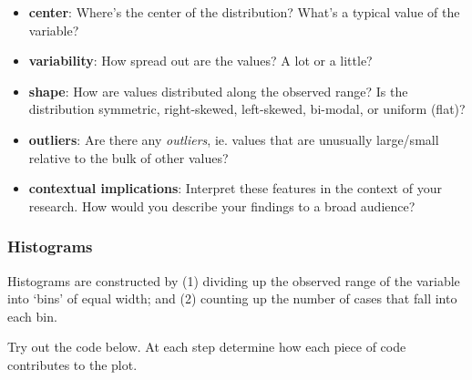 \documentclass[
  letterpaper,
  DIV=11,
  numbers=noendperiod]{scrreprt}
\newenvironment{Shaded}{\begin{snugshade}}{\end{snugshade}}
\newcommand{\NormalTok}[1]{\textcolor[rgb]{0.00,0.23,0.31}{#1}}
\providecommand{\tightlist}{%
  \setlength{\itemsep}{0pt}\setlength{\parskip}{0pt}}\usepackage{longtable,booktabs,array}
\begin{document}
\begin{itemize}
\tightlist
\item
  \textbf{center}: Where's the center of the distribution? What's a
  typical value of the variable?
\item
  \textbf{variability}: How spread out are the values? A lot or a
  little?
\item
  \textbf{shape}: How are values distributed along the observed range?
  Is the distribution symmetric, right-skewed, left-skewed, bi-modal, or
  uniform (flat)?\\
\item
  \textbf{outliers}: Are there any \emph{outliers}, ie. values that are
  unusually large/small relative to the bulk of other values?\\
\item
  \textbf{contextual implications}: Interpret these features in the
  context of your research. How would you describe your findings to a
  broad audience?
\end{itemize}

\subsubsection*{Histograms}\label{histograms}

Histograms are constructed by (1) dividing up the observed range of the
variable into `bins' of equal width; and (2) counting up the number of
cases that fall into each bin.

\begin{Shaded}
\begin{Highlighting}[]
\NormalTok{Try out the code below.  At each step determine how each piece of code contributes to the plot.    }
\end{Highlighting}
\end{Shaded}
\end{document}
